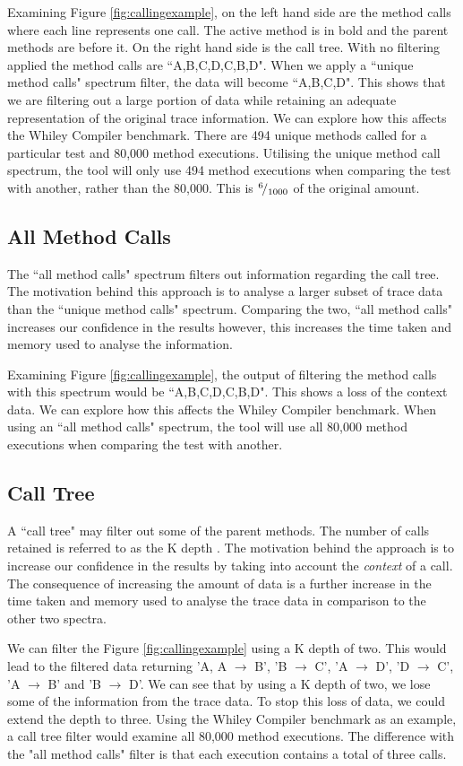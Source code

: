 Examining Figure \ref{fig:callingexample}, on the left hand side are the method calls where each line represents one call. The active method is in bold and the parent methods are before it. On the right hand side is the call tree. With no filtering applied the method calls are ``A,B,C,D,C,B,D". When we apply a ``unique method calls" spectrum filter, the data will become ``A,B,C,D". This shows that we are filtering out a large portion of data while retaining an adequate representation of the original trace information. We can explore how this affects the Whiley Compiler benchmark. There are 494 unique methods called for a particular test and 80,000 method executions. Utilising the unique method call spectrum, the tool will only use 494 method executions when comparing the test with another, rather than the 80,000. This is ${}^{6}\!/_{1000}$ of the original amount. 

\subsection{All Method Calls}
The ``all method calls" spectrum filters out information regarding the call tree. The motivation behind this approach is to analyse a larger subset of trace data than the ``unique method calls" spectrum. Comparing the two, ``all method calls" increases our confidence in the results however, this increases the time taken and memory used to analyse the information.

Examining Figure \ref{fig:callingexample}, the output of filtering the method calls with this spectrum would be ``A,B,C,D,C,B,D". This shows a loss of the context data. We can explore how this affects the Whiley Compiler benchmark. When using an ``all method calls" spectrum, the tool will use all 80,000 method executions when comparing the test with another.

\subsection{Call Tree}
A ``call tree" may filter out some of the parent methods. The number of calls retained is referred to as the K depth \cite{Zhuang06accurate}. The motivation behind the approach is to increase our confidence in the results by taking into account the \textit{context} of a call. The consequence of increasing the amount of data is a further increase in the time taken and memory used to analyse the trace data in comparison to the other two spectra.

We can filter the Figure \ref{fig:callingexample} using a K depth of two. This would lead to the filtered data returning 'A, A $\rightarrow$ B', 'B $\rightarrow$ C', 'A $\rightarrow$ D', 'D $\rightarrow$ C', 'A $\rightarrow$ B' and 'B $\rightarrow$ D'. We can see that by using a K depth of two, we lose some of the information from the trace data. To stop this loss of data, we could extend the depth to three. Using the Whiley Compiler benchmark as an example, a call tree filter would examine all 80,000 method executions. The difference with the "all method calls" filter is that each execution contains a total of three calls.

